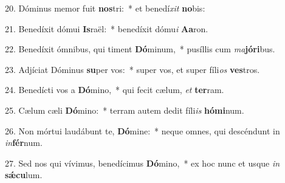 20. Dóminus memor fuit \textbf{nos}tri:~*  et benedí\textit{xit} \textbf{no}bis:\

21. Benedíxit dómui \textbf{Is}raël:~*  benedíxit dómu\textit{i} \textbf{A}\textbf{a}ron.\

22. Benedíxit ómnibus, qui timent \textbf{Dó}minum,~*  pusíllis cum \textit{ma}\textbf{jó}\textbf{ri}bus.\

23. Adjíciat Dóminus \textbf{su}per vos:~*  super vos, et super fíli\textit{os} \textbf{ves}tros.\

24. Benedícti vos a \textbf{Dó}mino,~*  qui fecit cælum, \textit{et} \textbf{ter}ram.\

25. Cælum cæli \textbf{Dó}mino:~*  terram autem dedit fíli\textit{is} \textbf{hó}\textbf{mi}num.\

26. Non mórtui laudábunt te, \textbf{Dó}mine:~*  neque omnes, qui descéndunt in \textit{in}\textbf{fér}num.\

27. Sed nos qui vívimus, benedícimus \textbf{Dó}mino,~*  ex hoc nunc et usque \textit{in} \textbf{sǽ}\textbf{cu}lum.\

